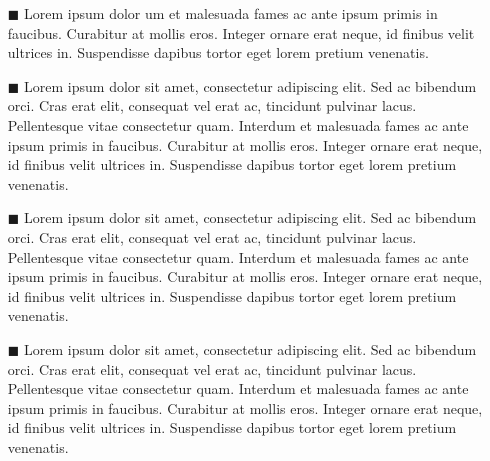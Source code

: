 \documentclass[./main.tex]{subfiles}
\begin{document}
\begin{itemize}
    
    \item[$\blacksquare$] Lorem ipsum dolor um et malesuada fames ac ante ipsum primis in faucibus. Curabitur at mollis eros. Integer ornare erat neque, id finibus velit ultrices in. Suspendisse dapibus tortor eget lorem pretium venenatis.
    
    \item[$\blacksquare$] Lorem ipsum dolor sit amet, consectetur adipiscing elit. Sed ac bibendum orci. Cras erat elit, consequat vel erat ac, tincidunt pulvinar lacus. Pellentesque vitae consectetur quam. Interdum et malesuada fames ac ante ipsum primis in faucibus. Curabitur at mollis eros. Integer ornare erat neque, id finibus velit ultrices in. Suspendisse dapibus tortor eget lorem pretium venenatis.
    
    \item[$\blacksquare$] Lorem ipsum dolor sit amet, consectetur adipiscing elit. Sed ac bibendum orci. Cras erat elit, consequat vel erat ac, tincidunt pulvinar lacus. Pellentesque vitae consectetur quam. Interdum et malesuada fames ac ante ipsum primis in faucibus. Curabitur at mollis eros. Integer ornare erat neque, id finibus velit ultrices in. Suspendisse dapibus tortor eget lorem pretium venenatis.
    
    \item[$\blacksquare$] Lorem ipsum dolor sit amet, consectetur adipiscing elit. Sed ac bibendum orci. Cras erat elit, consequat vel erat ac, tincidunt pulvinar lacus. Pellentesque vitae consectetur quam. Interdum et malesuada fames ac ante ipsum primis in faucibus. Curabitur at mollis eros. Integer ornare erat neque, id finibus velit ultrices in. Suspendisse dapibus tortor eget lorem pretium venenatis.
\end{itemize}
\end{document}
